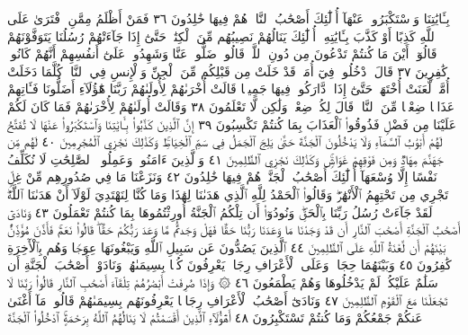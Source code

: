 بِـَٔايَٰتِنَا وَٱسْتَكْبَرُوا۟ عَنْهَآ أُو۟لَٰٓئِكَ أَصْحَٰبُ ٱلنَّارِۖ هُمْ فِيهَا
خَٰلِدُونَ ٣٦ فَمَنْ أَظْلَمُ مِمَّنِ ٱفْتَرَىٰ عَلَى ٱللَّهِ كَذِبًا أَوْ كَذَّبَ
بِـَٔايَٰتِهِۦٓۚ أُو۟لَٰٓئِكَ يَنَالُهُمْ نَصِيبُهُم مِّنَ ٱلْكِتَٰبِۖ حَتَّىٰٓ إِذَا جَآءَتْهُمْ
رُسُلُنَا يَتَوَفَّوْنَهُمْ قَالُوٓا۟ أَيْنَ مَا كُنتُمْ تَدْعُونَ مِن دُونِ ٱللَّهِۖ
قَالُوا۟ ضَلُّوا۟ عَنَّا وَشَهِدُوا۟ عَلَىٰٓ أَنفُسِهِمْ أَنَّهُمْ كَانُوا۟ كَٰفِرِينَ ٣٧
قَالَ ٱدْخُلُوا۟ فِيٓ أُمَمࣲ قَدْ خَلَتْ مِن قَبْلِكُم مِّنَ ٱلْجِنِّ وَٱلْإِنسِ
فِي ٱلنَّارِۖ كُلَّمَا دَخَلَتْ أُمَّةࣱ لَّعَنَتْ أُخْتَهَاۖ حَتَّىٰٓ إِذَا ٱدَّارَكُوا۟
فِيهَا جَمِيعࣰا قَالَتْ أُخْرَىٰهُمْ لِأُولَىٰهُمْ رَبَّنَا هَٰٓؤُلَآءِ أَضَلُّونَا فَـَٔاتِهِمْ
عَذَابࣰا ضِعْفࣰا مِّنَ ٱلنَّارِۖ قَالَ لِكُلࣲّ ضِعْفࣱ وَلَٰكِن لَّا تَعْلَمُونَ ٣٨
وَقَالَتْ أُولَىٰهُمْ لِأُخْرَىٰهُمْ فَمَا كَانَ لَكُمْ عَلَيْنَا مِن فَضْلࣲ
فَذُوقُوا۟ ٱلْعَذَابَ بِمَا كُنتُمْ تَكْسِبُونَ ٣٩ إِنَّ ٱلَّذِينَ
كَذَّبُوا۟ بِـَٔايَٰتِنَا وَٱسْتَكْبَرُوا۟ عَنْهَا لَا تُفَتَّحُ لَهُمْ أَبْوَٰبُ ٱلسَّمَآءِ
وَلَا يَدْخُلُونَ ٱلْجَنَّةَ حَتَّىٰ يَلِجَ ٱلْجَمَلُ فِي سَمِّ ٱلْخِيَاطِۚ وَكَذَٰلِكَ
نَجْزِي ٱلْمُجْرِمِينَ ٤٠ لَهُم مِّن جَهَنَّمَ مِهَادࣱ وَمِن فَوْقِهِمْ غَوَاشࣲۚ
وَكَذَٰلِكَ نَجْزِي ٱلظَّٰلِمِينَ ٤١ وَٱلَّذِينَ ءَامَنُوا۟ وَعَمِلُوا۟ ٱلصَّٰلِحَٰتِ
لَا نُكَلِّفُ نَفْسًا إِلَّا وُسْعَهَآ أُو۟لَٰٓئِكَ أَصْحَٰبُ ٱلْجَنَّةِۖ هُمْ
فِيهَا خَٰلِدُونَ ٤٢ وَنَزَعْنَا مَا فِي صُدُورِهِم مِّنْ غِلࣲّ تَجْرِي
مِن تَحْتِهِمُ ٱلْأَنْهَٰرُۖ وَقَالُوا۟ ٱلْحَمْدُ لِلَّهِ ٱلَّذِي هَدَىٰنَا لِهَٰذَا وَمَا كُنَّا
لِنَهْتَدِيَ لَوْلَآ أَنْ هَدَىٰنَا ٱللَّهُۖ لَقَدْ جَآءَتْ رُسُلُ رَبِّنَا بِٱلْحَقِّۖ
وَنُودُوٓا۟ أَن تِلْكُمُ ٱلْجَنَّةُ أُورِثْتُمُوهَا بِمَا كُنتُمْ تَعْمَلُونَ ٤٣
وَنَادَىٰٓ أَصْحَٰبُ ٱلْجَنَّةِ أَصْحَٰبَ ٱلنَّارِ أَن قَدْ وَجَدْنَا مَا وَعَدَنَا
رَبُّنَا حَقࣰّا فَهَلْ وَجَدتُّم مَّا وَعَدَ رَبُّكُمْ حَقࣰّاۖ قَالُوا۟ نَعَمْۚ فَأَذَّنَ
مُؤَذِّنُۢ بَيْنَهُمْ أَن لَّعْنَةُ ٱللَّهِ عَلَى ٱلظَّٰلِمِينَ ٤٤ ٱلَّذِينَ يَصُدُّونَ عَن
سَبِيلِ ٱللَّهِ وَيَبْغُونَهَا عِوَجࣰا وَهُم بِٱلْأٓخِرَةِ كَٰفِرُونَ ٤٥ وَبَيْنَهُمَا
حِجَابࣱۚ وَعَلَى ٱلْأَعْرَافِ رِجَالࣱ يَعْرِفُونَ كُلَّۢا بِسِيمَىٰهُمْۚ وَنَادَوْا۟
أَصْحَٰبَ ٱلْجَنَّةِ أَن سَلَٰمٌ عَلَيْكُمْۚ لَمْ يَدْخُلُوهَا وَهُمْ يَطْمَعُونَ ٤٦
۞ وَإِذَا صُرِفَتْ أَبْصَٰرُهُمْ تِلْقَآءَ أَصْحَٰبِ ٱلنَّارِ قَالُوا۟ رَبَّنَا لَا تَجْعَلْنَا
مَعَ ٱلْقَوْمِ ٱلظَّٰلِمِينَ ٤٧ وَنَادَىٰٓ أَصْحَٰبُ ٱلْأَعْرَافِ رِجَالࣰا يَعْرِفُونَهُم
بِسِيمَىٰهُمْ قَالُوا۟ مَآ أَغْنَىٰ عَنكُمْ جَمْعُكُمْ وَمَا كُنتُمْ تَسْتَكْبِرُونَ ٤٨
أَهَٰٓؤُلَآءِ ٱلَّذِينَ أَقْسَمْتُمْ لَا يَنَالُهُمُ ٱللَّهُ بِرَحْمَةٍۚ ٱدْخُلُوا۟ ٱلْجَنَّةَ
